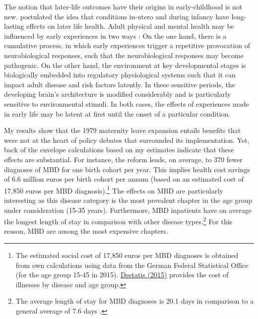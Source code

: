 \documentclass[11pt, a4paper]{article} %
\begin{document}
The notion that later-life outcomes have their origins in early-childhood is not new. \cite{Barker1990origins} postulated the idea that conditions in-utero and during infancy have long-lasting effects on later life health. Adult physical and mental health may be influenced by early experiences in two ways \citep{shonkoff2009neuroscience}: On the one hand, there is a cumulative process, in which early experiences trigger a repetitive provocation of neurobiological responses, such that the neurobiological responses may become pathogenic. On the other hand, the environment at key developmental stages is biologically embedded into regulatory physiological systems such that it can impact adult disease and risk factors latently. In these sensitive periods, the developing brain's architecture is modified considerably and is particularly sensitive to environmental stimuli. In both cases, the effects of experiences made in early life may be latent at first until the onset of a particular condition.\newline


My results show that the 1979 maternity leave expansion entails benefits that were not at the heart of policy debates that surrounded its implementation. Yet, back of the envelope calculations based on my estimates indicate that these effects are substantial. For instance, the reform leads, on average, to 370 fewer diagnoses of MBD for one birth cohort per year. This implies health cost savings of 6.6 million euros per birth cohort per annum (based on an estimated cost of 17,850 euros per MBD diagnosis).\footnote{The estimated social cost of 17,850 euros per MBD diagnoses is obtained from own calculations using data from the German Federal Statistical Office (for the age group 15-45 in 2015). \href{https://www.destatis.de/EN/Themes/Society-Environment/Health/Cost-Illness/Tables/disease-categories-age.html}{Destatis (2015)} provides the cost of illnesses by disease and age group.} The effects on MBD are particularly interesting as this disease category is the most prevalent chapter in the age group under consideration (15-35 years). Furthermore, MBD inpatients have on average the longest length of stay in comparison with other disease types.\footnote{The average length of stay for MBD diagnoses is 20.1 days in comparison to a general average of 7.6 days \cite[p. 5]{statistisches2012diagnosedaten}.} For this reason, MBD are among the most expensive chapters.\newline
\end{document}
